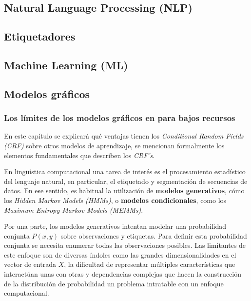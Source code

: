 \documentclass[letterpaper,12pt,oneside]{book}
\theoremstyle{definition}
\begin{document}



	

	\subsection{Natural Language Processing (NLP)}


	
	\subsection{Etiquetadores}

	

	\subsection{Machine Learning (ML)}

	
	\subsection{Modelos gráficos}

	

	


	
	\subsubsection{Los límites de los modelos gráficos en para bajos recursos}

	
	En este capítulo se explicará qué ventajas tienen los \emph{Conditional Random Fields (CRF)} sobre otros modelos de aprendizaje, se mencionan formalmente los elementos fundamentales que describen los \emph{CRF's}.

	
	En lingüística computacional una tarea de interés es el procesamiento estadístico del lenguaje natural, en particular, el etiquetado y segmentación de secuencias de datos. En ese sentido, es habitual la utilización de \textbf{modelos generativos}, cómo los \textit{Hidden Markov Models (HMMs)}, o \textbf{modelos condicionales}, como los \textit{Maximum Entropy Markov Models (MEMMs)}.

	
	Por una parte, los modelos generativos intentan modelar una probabilidad conjunta $P(x,y)$ sobre observaciones y etiquetas. Para definir esta probabilidad conjunta se necesita enumerar todas las observaciones posibles. Las limitantes de este enfoque son de diversas índoles como las grandes dimensionalidades en el vector de entrada $X$, la dificultad de representar múltiples características que interactúan unas con otras y dependencias complejas que hacen la construcción de la distribución de probabilidad un problema intratable con un enfoque computacional.
\end{document}

